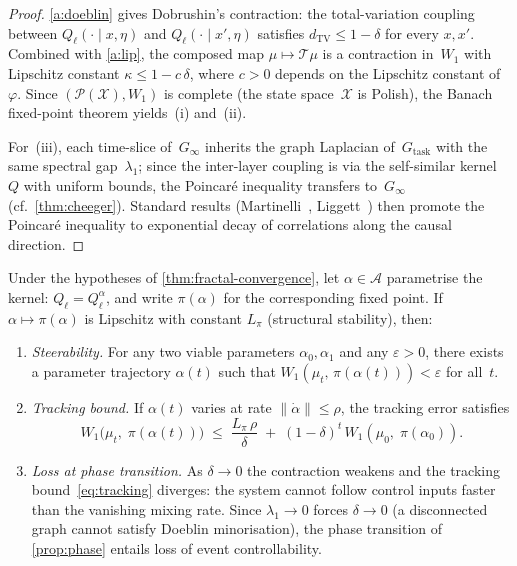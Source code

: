 \begin{proof}
\ref{a:doeblin} gives Dobrushin's contraction: the
total-variation coupling between
$Q_\ell(\cdot \mid x, \eta)$ and
$Q_\ell(\cdot \mid x', \eta)$ satisfies
$d_{\mathrm{TV}} \leq 1 - \delta$ for every $x, x'$.
Combined with \ref{a:lip}, the composed map
$\mu \mapsto \mathcal{T}\mu$ is a contraction in~$W_1$
with Lipschitz constant $\kappa \leq 1 - c\,\delta$,
where $c > 0$ depends on the Lipschitz constant
of~$\varphi$.
Since $(\mathcal{P}(\mathcal{X}), W_1)$ is complete
(the state space~$\mathcal{X}$ is Polish), the Banach
fixed-point theorem yields~(i) and~(ii).

For~(iii), each time-slice of~$G_\infty$ inherits the
graph Laplacian of~$G_{\mathrm{task}}$ with the same
spectral gap~$\lambda_1$; since the inter-layer coupling
is via the self-similar kernel~$Q$ with uniform bounds,
the Poincar\'{e} inequality transfers to~$G_\infty$
(cf.\ \cref{thm:cheeger}).
Standard results (Martinelli~\cite{martinelli1999},
Liggett~\cite{liggett2005}) then promote the
Poincar\'{e} inequality to exponential decay of
correlations along the causal direction.
\end{proof}

\begin{corollary}
\label{cor:event-controllability}
Under the hypotheses of \cref{thm:fractal-convergence},
let $\alpha \in \mathcal{A}$ parametrise the kernel:
$Q_\ell = Q_\ell^\alpha$, and write $\pi(\alpha)$ for the
corresponding fixed point.  If
$\alpha \mapsto \pi(\alpha)$ is Lipschitz with constant
$L_\pi$ (structural stability), then:
\begin{enumerate}[label=\textup{(\roman*)},nosep]
  \item \emph{Steerability.}  For any two viable
  parameters $\alpha_0, \alpha_1$ and any
  $\varepsilon > 0$, there exists a parameter
  trajectory $\alpha(t)$ such that
  $W_1(\mu_t,\, \pi(\alpha(t))) < \varepsilon$ for
  all~$t$.
  \item \emph{Tracking bound.}  If $\alpha(t)$ varies
  at rate $\|\dot{\alpha}\| \leq \rho$, the tracking
  error satisfies
  \begin{equation}\label{eq:tracking}
    W_1\!\bigl(\mu_t,\;\pi(\alpha(t))\bigr)
    \;\leq\;
    \frac{L_\pi\,\rho}{\delta}
    \;+\;
    (1 - \delta)^{t}\,W_1(\mu_0,\;\pi(\alpha_0)).
  \end{equation}
  \item \emph{Loss at phase transition.}  As
  $\delta \to 0$ the contraction weakens and the
  tracking bound~\eqref{eq:tracking} diverges:
  the system cannot follow control inputs faster than
  the vanishing mixing rate.  Since $\lambda_1 \to 0$
  forces $\delta \to 0$ (a disconnected graph cannot
  satisfy Doeblin minorisation), the phase transition
  of \cref{prop:phase} entails loss of event
  controllability.
\end{enumerate}
\end{corollary}

